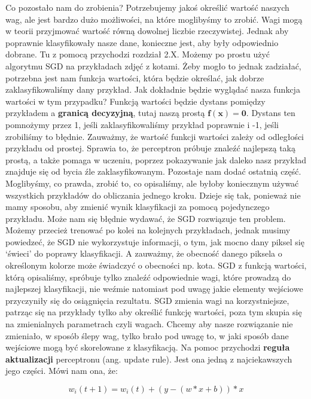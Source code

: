 Co pozostało nam do zrobienia? Potrzebujemy jakoś określić wartość naszych wag, ale jest bardzo dużo możliwości, na które moglibyśmy to zrobić. Wagi mogą w teorii przyjmować wartość równą dowolnej liczbie rzeczywistej. Jednak aby poprawnie klasyfikowały nasze dane, konieczne jest, aby były odpowiednio dobrane. Tu z pomocą przychodzi rozdział 2.X. Możemy po prostu użyć algorytmu SGD na przykładach zdjęć z kotami. Żeby mogło to jednak zadziałać, potrzebna jest nam funkcja wartości, która będzie określać, jak dobrze zaklasyfikowaliśmy dany przykład. Jak dokładnie będzie wyglądać nasza funkcja wartości w tym przypadku? Funkcją wartości będzie dystans pomiędzy przykładem a \textbf{granicą decyzyjną}, tutaj naszą prostą $\boldsymbol{f(x) = 0}$. Dystans ten pomnożymy przez 1, jeśli zaklasyfikowaliśmy przykład poprawnie i -1, jeśli zrobiliśmy to błędnie. Zauważmy, że wartość funkcji wartości zależy od odległości przykładu od prostej. Sprawia to, że perceptron próbuje znaleźć najlepszą taką prostą, a także pomaga w uczeniu, poprzez pokazywanie jak daleko nasz przykład znajduje się od bycia źle zaklasyfikowanym. Pozostaje nam dodać ostatnią część. Moglibyśmy, co prawda, zrobić to, co opisaliśmy, ale byłoby koniecznym używać wszystkich przykładów do obliczania jednego kroku. Dzieje się tak, ponieważ nie mamy sposobu, aby zmienić wynik klasyfikacji za pomocą pojedynczego przykładu. Może nam się błędnie wydawać, że SGD rozwiązuje ten problem. Możemy przecież trenować po kolei na kolejnych przykładach, jednak musimy powiedzeć, że SGD nie wykorzystuje informacji, o tym, jak mocno dany piksel się ‘świeci’ do poprawy klasyfikacji. A zauważmy, że obecność danego piksela o określonym kolorze może świadczyć o obecności np. kota. SGD z funkcją wartości, którą opisaliśmy, spróbuje tylko znaleźć odpowiednie wagi, które prowadzą do najlepszej klasyfikacji, nie weźmie natomiast pod uwagę jakie elementy wejściowe przyczyniły się do osiągnięcia rezultatu. SGD zmienia wagi na korzystniejsze, patrząc się na przykłady tylko aby określić funkcję wartości, poza tym skupia się na zmienialnych parametrach czyli wagach. Chcemy aby nasze rozwiązanie nie zmieniało, w sposób ślepy wag, tylko brało pod uwagę to, w jaki sposób dane wejściowe mogą być skorelowane z klasyfikacją. Na pomoc przychodzi \textbf{reguła aktualizacji} perceptronu (ang. update rule). Jest ona jedną z najciekawszych jego części. Mówi nam ona, że:

\begin{equation}
w_i(t+1) = w_i(t) + (y - (w * x + b)) * x
\end{equation}


